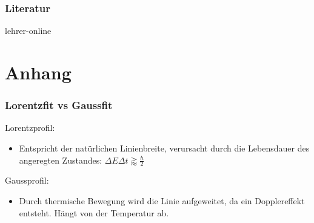 \documentclass[compress]{beamer}
\begin{document}
\begin{frame}
    \frametitle{Literatur}

    \vspace{0.2cm} %
    \begin{thebibliography}{10}
	
	\beamertemplateonlinebibitems
        lehrer-online
	\newblock {}

	
	


    \end{thebibliography}

 
\end{frame}

%

\section{Anhang}
\begin{frame}
    \frametitle{Lorentzfit vs Gaussfit}

    \vspace{1cm} %
    Lorentzprofil:
    \begin{itemize}
     \item Entspricht der natürlichen Linienbreite, verursacht durch die Lebensdauer des angeregten Zustandes: $\Delta E \Delta t \gtrapprox \frac{\hbar}{2}$
    \end{itemize}
    Gaussprofil:
    \begin{itemize}
     \item Durch thermische Bewegung wird die Linie aufgeweitet, da ein Dopplereffekt entsteht. Hängt von der Temperatur ab.
    \end{itemize}
 
 
\end{frame}
\end{document}
